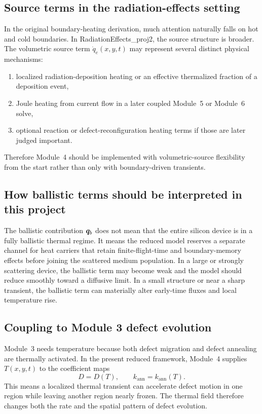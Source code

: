 \documentclass[11pt]{article}
\begin{document}
\subsection{Source terms in the radiation-effects setting}
In the original boundary-heating derivation, much attention naturally falls on hot and cold boundaries. In RadiationEffects\_proj2, the source structure is broader. The volumetric source term $\dot{q}_e(x,y,t)$ may represent several distinct physical mechanisms:
\begin{enumerate}[leftmargin=1.6em]
    \item localized radiation-deposition heating or an effective thermalized fraction of a deposition event,
    \item Joule heating from current flow in a later coupled Module~5 or Module~6 solve,
    \item optional reaction or defect-reconfiguration heating terms if those are later judged important.
\end{enumerate}
Therefore Module~4 should be implemented with volumetric-source flexibility from the start rather than only with boundary-driven transients.

\subsection{How ballistic terms should be interpreted in this project}
The ballistic contribution $\bm{q}_b$ does not mean that the entire silicon device is in a fully ballistic thermal regime. It means the reduced model reserves a separate channel for heat carriers that retain finite-flight-time and boundary-memory effects before joining the scattered medium population. In a large or strongly scattering device, the ballistic term may become weak and the model should reduce smoothly toward a diffusive limit. In a small structure or near a sharp transient, the ballistic term can materially alter early-time fluxes and local temperature rise.

\subsection{Coupling to Module 3 defect evolution}
Module~3 needs temperature because both defect migration and defect annealing are thermally activated. In the present reduced framework, Module~4 supplies $T(x,y,t)$ to the coefficient maps
\begin{equation}
D = D(T), \qquad k_{\mathrm{ann}} = k_{\mathrm{ann}}(T).
\end{equation}
This means a localized thermal transient can accelerate defect motion in one region while leaving another region nearly frozen. The thermal field therefore changes both the rate and the spatial pattern of defect evolution.
\end{document}
